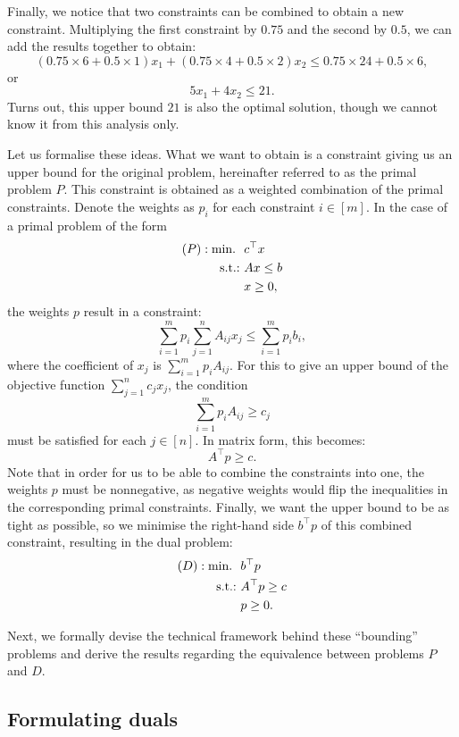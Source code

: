 Finally, we notice that two constraints can be combined to obtain a new constraint. Multiplying the first constraint by $0.75$ and the second by $0.5$, we can add the results together to obtain:
$$
(0.75 \times 6 + 0.5 \times 1)x_1 + (0.75 \times 4 + 0.5 \times 2)x_2 \leq 0.75 \times 24 + 0.5 \times 6,
$$
or
$$
5x_1 + 4x_2 \leq 21.
$$
Turns out, this upper bound $21$ is also the optimal solution, though we cannot know it from this analysis only.

Let us formalise these ideas. What we want to obtain is a constraint giving us an upper bound for the original problem, hereinafter referred to as the primal problem $P$. This constraint is obtained as a weighted combination of the primal constraints. Denote the weights as $p_i$ for each constraint $i \in [m]$. In the case of a primal problem of the form
%
\begin{align*}
	(P) : \mathop{\text{min.~}} \ & c^\top x \\
	\mathop{\text{s.t.:~}} 	  & Ax \leq b \\
		  	  & x \geq 0,   
\end{align*}
%
the weights $p$ result in a constraint:
%
$$
\sum_{i=1}^m p_i \sum_{j=1}^n A_{ij} x_j \leq \sum_{i=1}^m p_i b_i,
$$
%
where the coefficient of $x_j$ is $\sum_{i=1}^m p_i A_{ij}$. For this to give an upper bound of the objective function $\sum_{j=1}^n c_j x_j$, the condition
%
$$
\sum_{i=1}^m p_i A_{ij} \geq c_j
$$
%
must be satisfied for each $j \in [n]$. In matrix form, this becomes:
%
$$
A^\top p \geq c.
$$
%
Note that in order for us to be able to combine the constraints into one, the weights $p$ must be nonnegative, as negative weights would flip the inequalities in the corresponding primal constraints. Finally, we want the upper bound to be as tight as possible, so we minimise the right-hand side $b^\top p$ of this combined constraint, resulting in the dual problem:
%
\begin{align*}
	(D) : \mathop{\text{min.~}} \ & b^\top p \\
	\mathop{\text{s.t.:~}} 	  & A^\top p \geq c \\
			  & p \geq 0.
\end{align*}


Next, we formally devise the technical framework behind these ``bounding'' problems and derive the results regarding the equivalence between problems $P$ and $D$.


\subsection{Formulating duals}

